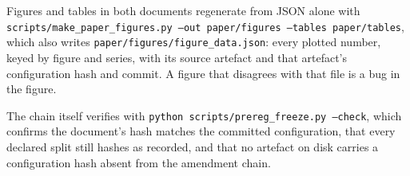 \documentclass[10pt]{article}
\begin{document}
\noindent Figures and tables in both documents regenerate from JSON alone with
\texttt{scripts/make\_paper\_figures.py --out paper/figures --tables
paper/tables}, which also writes \texttt{paper/figures/figure\_data.json}: every
plotted number, keyed by figure and series, with its source artefact and that
artefact's configuration hash and commit. A figure that disagrees with that file
is a bug in the figure.

The chain itself verifies with \texttt{python scripts/prereg\_freeze.py --check},
which confirms the document's hash matches the committed configuration, that
every declared split still hashes as recorded, and that no artefact on disk
carries a configuration hash absent from the amendment chain.
\end{document}
